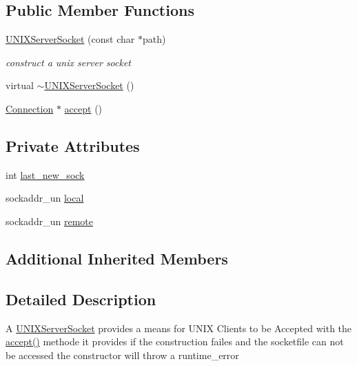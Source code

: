 \subsection*{Public Member Functions}
\begin{DoxyCompactItemize}
\item 
\hyperlink{classUNIXServerSocket_a529968cfbf9c158cf5420654b503d4b1}{U\+N\+I\+X\+Server\+Socket} (const char $\ast$path)
\begin{DoxyCompactList}\small\item\em construct a unix server socket \end{DoxyCompactList}\item 
virtual \hyperlink{classUNIXServerSocket_a53d5ee91751f59e2ee719fe074dc468f}{$\sim$\+U\+N\+I\+X\+Server\+Socket} ()
\item 
\hyperlink{classConnection}{Connection} $\ast$ \hyperlink{classUNIXServerSocket_a1bd19b56a910dc3811d4d54c30fbf3f5}{accept} ()
\end{DoxyCompactItemize}
\subsection*{Private Attributes}
\begin{DoxyCompactItemize}
\item 
int \hyperlink{classUNIXServerSocket_ab5864738b5d930ec0cf0017e0a6b4c84}{last\+\_\+new\+\_\+sock}
\item 
sockaddr\+\_\+un \hyperlink{classUNIXServerSocket_a8e6873260b9bb0e49ed09a4d03694044}{local}
\item 
sockaddr\+\_\+un \hyperlink{classUNIXServerSocket_a19d9cd6705ffa42363e04f989b0c4904}{remote}
\end{DoxyCompactItemize}
\subsection*{Additional Inherited Members}


\subsection{Detailed Description}
A \hyperlink{classUNIXServerSocket}{U\+N\+I\+X\+Server\+Socket} provides a means for U\+N\+I\+X Clients to be Accepted with the \hyperlink{classUNIXServerSocket_a1bd19b56a910dc3811d4d54c30fbf3f5}{accept()} methode it provides if the construction failes and the socketfile can not be accessed the constructor will throw a runtime\+\_\+error 

